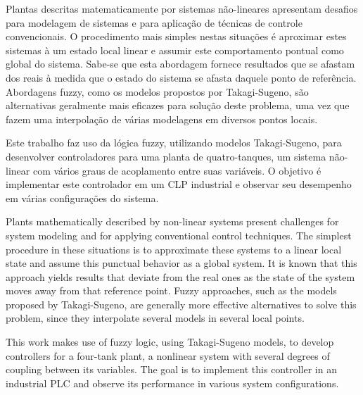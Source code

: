 %
{
	\indent Plantas descritas matematicamente por sistemas não-lineares apresentam desafios para modelagem de sistemas e para aplicação de técnicas de controle convencionais. O procedimento mais simples nestas situações é aproximar estes sistemas à um estado local linear e assumir este comportamento pontual como global do sistema. Sabe-se que esta abordagem fornece resultados que se afastam dos reais à medida que o estado do sistema se afasta daquele ponto de referência. Abordagens fuzzy, como os modelos propostos por Takagi-Sugeno, são alternativas geralmente mais eficazes para solução deste problema, uma vez que fazem uma interpolação de várias modelagens em diversos pontos locais.
	
	Este trabalho faz uso da lógica fuzzy, utilizando modelos Takagi-Sugeno, para desenvolver controladores para uma planta de quatro-tanques, um sistema não-linear com vários graus de acoplamento entre suas variáveis. O objetivo é implementar este controlador em um CLP industrial e observar seu desempenho em várias configurações do sistema.
}
\vspace*{2cm}
{
	\indent Plants mathematically described by non-linear systems present challenges for system modeling and for applying conventional control techniques. The simplest procedure in these situations is to approximate these systems to a linear local state and assume this punctual behavior as a global system. It is known that this approach yields results that deviate from the real ones as the state of the system moves away from that reference point. Fuzzy approaches, such as the models proposed by Takagi-Sugeno, are generally more effective alternatives to solve this problem, since they interpolate several models in several local points.
	
	This work makes use of fuzzy logic, using Takagi-Sugeno models, to develop controllers for a four-tank plant, a nonlinear system with several degrees of coupling between its variables. The goal is to implement this controller in an industrial PLC and observe its performance in various system configurations.
}%

